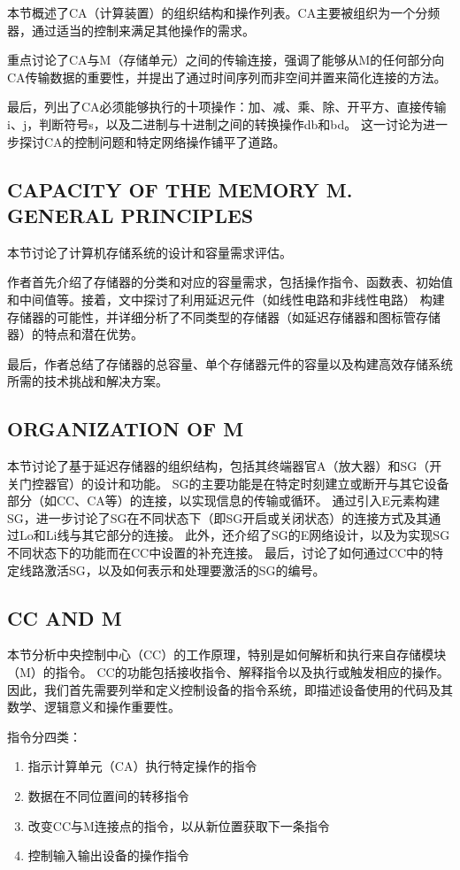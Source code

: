 \documentclass[12pt]{article} %
\theoremstyle{definition}
\begin{document}
本节概述了CA（计算装置）的组织结构和操作列表。CA主要被组织为一个分频器，通过适当的控制来满足其他操作的需求。

重点讨论了CA与M（存储单元）之间的传输连接，强调了能够从M的任何部分向CA传输数据的重要性，并提出了通过时间序列而非空间并置来简化连接的方法。

最后，列出了CA必须能够执行的十项操作：加、减、乘、除、开平方、直接传输i、j，判断符号s，以及二进制与十进制之间的转换操作db和bd。
这一讨论为进一步探讨CA的控制问题和特定网络操作铺平了道路。

\subsection{CAPACITY OF THE MEMORY M. GENERAL PRINCIPLES}

本节讨论了计算机存储系统的设计和容量需求评估。

作者首先介绍了存储器的分类和对应的容量需求，包括操作指令、函数表、初始值和中间值等。接着，文中探讨了利用延迟元件（如线性电路和非线性电路）
构建存储器的可能性，并详细分析了不同类型的存储器（如延迟存储器和图标管存储器）的特点和潜在优势。

最后，作者总结了存储器的总容量、单个存储器元件的容量以及构建高效存储系统所需的技术挑战和解决方案。

\subsection{ORGANIZATION OF M}

本节讨论了基于延迟存储器的组织结构，包括其终端器官A（放大器）和SG（开关门控器官）的设计和功能。
SG的主要功能是在特定时刻建立或断开与其它设备部分（如CC、CA等）的连接，以实现信息的传输或循环。
通过引入E元素构建SG，进一步讨论了SG在不同状态下（即SG开启或关闭状态）的连接方式及其通过Lo和Li线与其它部分的连接。
此外，还介绍了SG的E网络设计，以及为实现SG不同状态下的功能而在CC中设置的补充连接。
最后，讨论了如何通过CC中的特定线路激活SG，以及如何表示和处理要激活的SG的编号。

\subsection{CC AND M}

本节分析中央控制中心（CC）的工作原理，特别是如何解析和执行来自存储模块（M）的指令。
CC的功能包括接收指令、解释指令以及执行或触发相应的操作。因此，我们首先需要列举和定义控制设备的指令系统，即描述设备使用的代码及其数学、逻辑意义和操作重要性。

指令分四类：
\begin{enumerate}
  \item 指示计算单元（CA）执行特定操作的指令
  \item 数据在不同位置间的转移指令
  \item 改变CC与M连接点的指令，以从新位置获取下一条指令
  \item 控制输入输出设备的操作指令
\end{enumerate}
\end{document}
